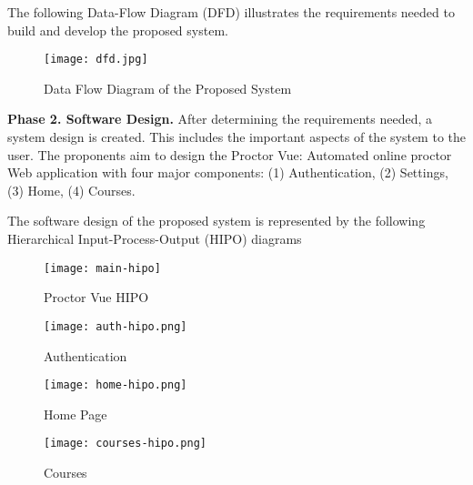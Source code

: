 The following Data-Flow Diagram (DFD) illustrates the requirements needed to build and develop the proposed system.

\begin{figure}[h!]
   \begin{center}
      \texttt{[image: dfd.jpg]}
      \caption{Data Flow Diagram of the Proposed System}
   \end{center}
\end{figure}

\textbf{Phase 2. Software Design.}
After determining the requirements needed, a system design is created.
This includes the important aspects of the system to the user.
The proponents aim to design the Proctor Vue: Automated online proctor Web application with four major components: (1) Authentication, (2) Settings, (3) Home, (4) Courses.

The software design of the proposed system is represented by the following Hierarchical Input-Process-Output (HIPO) diagrams

\begin{figure}[h!]
   \begin{center}
      \texttt{[image: main-hipo]}
      \caption{Proctor Vue HIPO}
   \end{center}
\end{figure}

\vspace{1cm}

\begin{figure}[h!]
   \begin{center}
      \texttt{[image: auth-hipo.png]}
      \caption{Authentication}
   \end{center}
\end{figure}

\vspace{1cm}

\begin{figure}[h!]
   \begin{center}
      \texttt{[image: home-hipo.png]}
      \caption{Home Page}
   \end{center}
\end{figure}

\vspace{1cm}

\begin{figure}[h!]
   \begin{center}
      \texttt{[image: courses-hipo.png]}
      \caption{Courses}
   \end{center}
\end{figure}

